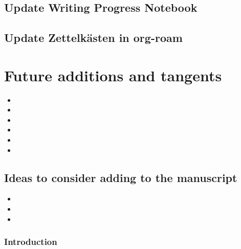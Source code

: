 \documentclass[11pt,letterpaper]{article}
\begin{document}
\subsection{Update Writing Progress Notebook}
\label{sec:orgde2f8b9}


\subsection{Update Zettelkästen in org-roam}
\label{sec:org5408df5}



\section{Future additions and tangents}
\label{sec:orgcd88e1a}

\begin{itemize}
\item 

\item 

\item 

\item 

\item 

\item 
\end{itemize}



\subsection{Ideas to consider adding to the manuscript}
\label{sec:org5eda2de}



\begin{itemize}
\item 

\item 

\item 
\end{itemize}

\subsubsection{Introduction}
\label{sec:org88908eb}
\end{document}

